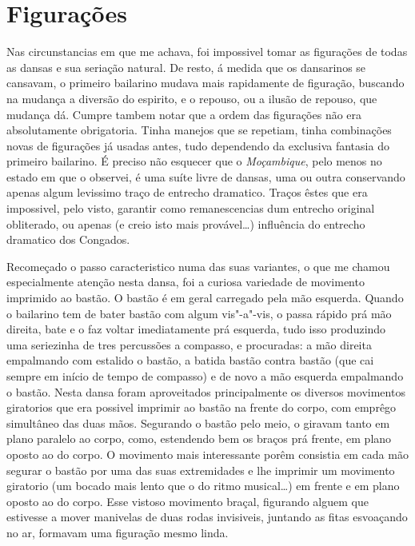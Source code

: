 \section*{Figurações}

Nas circunstancias em que me achava, foi impossivel tomar as figurações
de todas as dansas e sua seriação natural. De resto, á medida que os
dansarinos se cansavam, o primeiro bailarino mudava mais rapidamente de
figuração, buscando na mudança a diversão do espirito, e o repouso, ou a
ilusão de repouso, que mudança dá. Cumpre tambem notar que a ordem das
figurações não era absolutamente obrigatoria. Tinha manejos que se
repetiam, tinha combinações novas de figurações já usadas antes, tudo
dependendo da exclusiva fantasia do primeiro bailarino. É preciso não
esquecer que o \emph{Moçambique}, pelo menos no estado em que o
observei, é uma suíte livre de dansas, uma ou outra conservando apenas
algum levissimo traço de entrecho dramatico. Traços êstes que era
impossivel, pelo visto, garantir como remanescencias dum entrecho
original obliterado, ou apenas (e creio isto mais provável\ldots{})
influência do entrecho dramatico dos Congados.

Recomeçado o passo caracteristico numa das suas variantes, o que me
chamou especialmente atenção nesta dansa, foi a curiosa variedade de
movimento imprimido ao bastão. O bastão é em geral carregado pela mão
esquerda. Quando o bailarino tem de bater bastão com algum vis"-a"-vis, o
passa rápido prá mão direita, bate e o faz voltar imediatamente prá
esquerda, tudo isso produzindo uma seriezinha de tres percussões a
compasso, e procuradas: a mão direita empalmando com estalido o bastão,
a batida bastão contra bastão (que cai sempre em início de tempo de
compasso) e de novo a mão esquerda empalmando o bastão. Nesta dansa
foram aproveitados principalmente os diversos movimentos giratorios que
era possivel imprimir ao bastão na frente do corpo, com emprêgo
simultâneo das duas mãos. Segurando o bastão pelo meio, o giravam tanto
em plano paralelo ao corpo, como, estendendo bem os braços prá frente,
em plano oposto ao do corpo. O movimento mais interessante porêm
consistia em cada mão segurar o bastão por uma das suas extremidades e
lhe imprimir um movimento giratorio (um bocado mais lento que o do ritmo
musical\ldots{}) em frente e em plano oposto ao do corpo. Esse vistoso
movimento braçal, figurando alguem que estivesse a mover manivelas de
duas rodas invisiveis, juntando as fitas esvoaçando no ar, formavam uma
figuração mesmo linda.

\pagebreak

